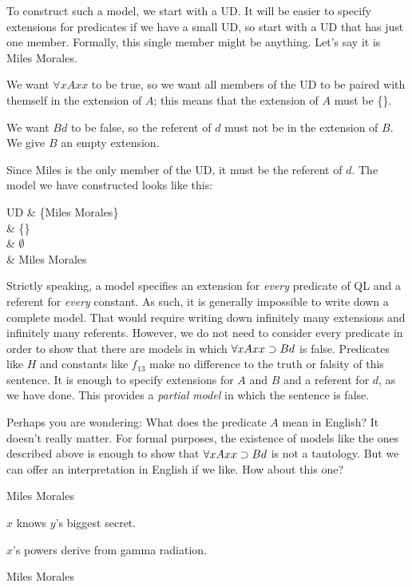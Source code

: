 To construct such a model, we start with a UD. It will be easier to specify extensions for predicates if we have a small UD, so start with a UD that has just one member. Formally, this single member might be anything. Let's say it is Miles Morales.

We want $\forall x Axx$ to be true, so we want all members of the UD to be paired with themself in the extension of $A$; this means that the extension of $A$ must be \{\}.

We want $Bd$ to be false, so the referent of $d$ must not be in the extension of $B$. We give $B$ an empty extension.

Since Miles is the only member of the UD, it must be the referent of $d$. The model we have constructed looks like this:
\begin{partialmodel}
	UD			& \{Miles Morales\}\\
	 	& \{\}\\
		& $\emptyset$\\
		& Miles Morales
\end{partialmodel}

Strictly speaking, a model specifies an extension for \emph{every} predicate of QL and a referent for \emph{every} constant. As such, it is generally impossible to write down a complete model. That would require writing down infinitely many extensions and infinitely many referents. However, we do not need to consider every predicate in order to show that there are models in which $\forall xAxx \supset Bd$ is false. Predicates like $H$ and constants like $f_{13}$ make no difference to the truth or falsity of this sentence. It is enough to specify extensions for $A$ and $B$ and a referent for $d$, as we have done. This provides a \emph{partial model} in which the sentence is false.

Perhaps you are wondering: What does the predicate $A$ mean in English? It doesn't really matter. For formal purposes, the existence of models like the ones described above is enough to show that $\forall x Axx \supset Bd$ is not a tautology. But we can offer an interpretation in English if we like. How about this one?

\begin{ekey}
\item[UD:] Miles Morales
\item[$Axy$:] $x$ knows $y$'s biggest secret.
\item[$Bx$:] $x$'s powers derive from gamma radiation.
\item[$d$:] Miles Morales
\end{ekey}

